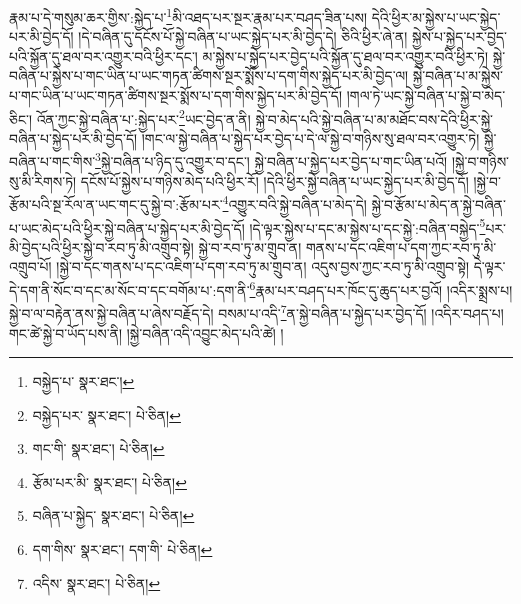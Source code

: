 རྣམ་པ་དེ་གསུམ་ཆར་གྱིས་:སྐྱེད་པ་\footnote{བསྐྱེད་པ་  སྣར་ཐང་། }མི་འཐད་པར་སྔར་རྣམ་པར་བཤད་ཟིན་པས། དེའི་ཕྱིར་མ་སྐྱེས་པ་ཡང་སྐྱེད་པར་མི་བྱེད་དོ། །དེ་བཞིན་དུ་དངོས་པོ་སྐྱེ་བཞིན་པ་ཡང་སྐྱེད་པར་མི་བྱེད་དེ། ཅིའི་ཕྱིར་ཞེ་ན། སྐྱེས་པ་སྐྱེད་པར་བྱེད་པའི་སྐྱོན་དུ་ཐལ་བར་འགྱུར་བའི་ཕྱིར་དང་། མ་སྐྱེས་པ་སྐྱེད་པར་བྱེད་པའི་སྐྱོན་དུ་ཐལ་བར་འགྱུར་བའི་ཕྱིར་ཏེ། སྐྱེ་བཞིན་པ་སྐྱེས་པ་གང་ཡིན་པ་ཡང་གཏན་ཚིགས་སྔར་སྨོས་པ་དག་གིས་སྐྱེད་པར་མི་བྱེད་ལ། སྐྱེ་བཞིན་པ་མ་སྐྱེས་པ་གང་ཡིན་པ་ཡང་གཏན་ཚིགས་སྔར་སྨོས་པ་དག་གིས་སྐྱེད་པར་མི་བྱེད་དོ། །གལ་ཏེ་ཡང་སྐྱེ་བཞིན་པ་སྐྱེ་བ་མེད་ཅིང་། འོན་ཀྱང་སྐྱེ་བཞིན་པ་:སྐྱེད་པར་\footnote{བསྐྱེད་པར་  སྣར་ཐང་།  པེ་ཅིན། }ཡང་བྱེད་ན་ནི། སྐྱེ་བ་མེད་པའི་སྐྱེ་བཞིན་པ་མ་མཐོང་བས་དེའི་ཕྱིར་སྐྱེ་བཞིན་པ་སྐྱེད་པར་མི་བྱེད་དོ། །གང་ལ་སྐྱེ་བཞིན་པ་སྐྱེད་པར་བྱེད་པ་དེ་ལ་སྐྱེ་བ་གཉིས་སུ་ཐལ་བར་འགྱུར་ཏེ། སྐྱེ་བཞིན་པ་གང་གིས་\footnote{གང་གི་  སྣར་ཐང་།  པེ་ཅིན། }སྐྱེ་བཞིན་པ་ཉིད་དུ་འགྱུར་བ་དང་། སྐྱེ་བཞིན་པ་སྐྱེད་པར་བྱེད་པ་གང་ཡིན་པའོ། །སྐྱེ་བ་གཉིས་སུ་མི་རིགས་ཏེ། དངོས་པོ་སྐྱེས་པ་གཉིས་མེད་པའི་ཕྱིར་རོ། །དེའི་ཕྱིར་སྐྱེ་བཞིན་པ་ཡང་སྐྱེད་པར་མི་བྱེད་དོ། །སྐྱེ་བ་རྩོམ་པའི་སྔ་རོལ་ན་ཡང་གང་དུ་སྐྱེ་བ་:རྩོམ་པར་\footnote{རྩོམ་པར་མི་  སྣར་ཐང་།  པེ་ཅིན། }འགྱུར་བའི་སྐྱེ་བཞིན་པ་མེད་དེ། སྐྱེ་བ་རྩོམ་པ་མེད་ན་སྐྱེ་བཞིན་པ་ཡང་མེད་པའི་ཕྱིར་སྐྱེ་བཞིན་པ་སྐྱེད་པར་མི་བྱེད་དོ། །དེ་ལྟར་སྐྱེས་པ་དང་མ་སྐྱེས་པ་དང་སྐྱེ་:བཞིན་བསྐྱེད་\footnote{བཞིན་པ་སྐྱེད་  སྣར་ཐང་།  པེ་ཅིན། }པར་མི་བྱེད་པའི་ཕྱིར་སྐྱེ་བ་རབ་ཏུ་མི་འགྲུབ་སྟེ། སྐྱེ་བ་རབ་ཏུ་མ་གྲུབ་ན། གནས་པ་དང་འཇིག་པ་དག་ཀྱང་རབ་ཏུ་མི་འགྲུབ་པོ། །སྐྱེ་བ་དང་གནས་པ་དང་འཇིག་པ་དག་རབ་ཏུ་མ་གྲུབ་ན། འདུས་བྱས་ཀྱང་རབ་ཏུ་མི་འགྲུབ་སྟེ། དེ་ལྟར་དེ་དག་ནི་སོང་བ་དང་མ་སོང་བ་དང་བགོམ་པ་:དག་ནི་\footnote{དག་གིས་  སྣར་ཐང་། དག་གི་  པེ་ཅིན། }རྣམ་པར་བཤད་པར་ཁོང་དུ་ཆུད་པར་བྱའོ། །འདིར་སྨྲས་པ། སྐྱེ་བ་ལ་བརྟེན་ནས་སྐྱེ་བཞིན་པ་ཞེས་བརྗོད་དེ། བསམ་པ་འདི་\footnote{འདིས་  སྣར་ཐང་།  པེ་ཅིན། }ན་སྐྱེ་བཞིན་པ་སྐྱེད་པར་བྱེད་དོ། །འདིར་བཤད་པ། གང་ཚེ་སྐྱེ་བ་ཡོད་པས་ནི། །སྐྱེ་བཞིན་འདི་འབྱུང་མེད་པའི་ཚེ། །

